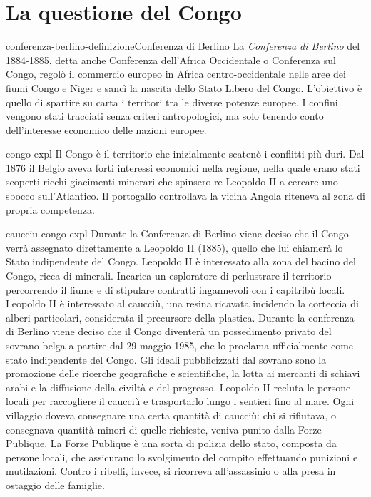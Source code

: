 \documentclass[preview]{standalone}
\begin{document}
\section{La questione del Congo}

\begin{snippetdefinition}{conferenza-berlino-definizione}{Conferenza di Berlino}
    La \textit{Conferenza di Berlino} del 1884-1885,
    detta anche Conferenza dell'Africa Occidentale o Conferenza sul Congo,
    regolò il commercio europeo in Africa
    centro-occidentale nelle aree dei fiumi Congo e Niger e sancì la
    nascita dello Stato Libero del Congo.
    L'obiettivo è quello di spartire su carta i territori tra le diverse potenze europee. 
    I confini vengono stati tracciati senza criteri antropologici,
    ma solo tenendo conto dell'interesse economico
    delle nazioni europee.
\end{snippetdefinition}

\begin{snippet}{congo-expl}
    Il Congo è il territorio che inizialmente scatenò i conflitti più duri.
    Dal 1876 il Belgio aveva forti interessi economici nella regione, nella quale
    erano stati scoperti ricchi giacimenti minerari che spinsero re Leopoldo II a cercare
    uno sbocco sull'Atlantico. Il portogallo controllava la vicina Angola riteneva al zona di propria competenza.
\end{snippet}

\begin{snippet}{caucciu-congo-expl}
    Durante la Conferenza di Berlino viene deciso che il Congo verrà assegnato
    direttamente a Leopoldo II (1885), quello che lui chiamerà lo Stato indipendente del Congo.
    Leopoldo II è interessato alla zona del bacino del Congo, ricca di
    minerali. Incarica un esploratore di perlustrare il territorio percorrendo il fiume e di stipulare
    contratti ingannevoli con i capitribù locali. Leopoldo II è interessato al caucciù, una resina
    ricavata incidendo la corteccia di alberi particolari, considerata il precursore della plastica.
    Durante la conferenza di Berlino viene deciso che il Congo diventerà un possedimento
    privato del sovrano belga a partire dal 29 maggio 1985, che lo proclama ufficialmente come
    stato indipendente del Congo. Gli ideali pubblicizzati dal sovrano sono la promozione delle
    ricerche geografiche e scientifiche, la lotta ai mercanti di schiavi arabi e la diffusione della
    civiltà e del progresso. Leopoldo II recluta le persone locali per raccogliere il caucciù e
    trasportarlo lungo i sentieri fino al mare. Ogni villaggio doveva consegnare una certa
    quantità di caucciù: chi si rifiutava, o consegnava quantità minori di quelle richieste, veniva
    punito dalla Forze Publique. La Forze Publique è una sorta di polizia dello stato, composta
    da persone locali, che assicurano lo svolgimento del compito effettuando punizioni e
    mutilazioni. Contro i ribelli, invece, si ricorreva all'assassinio o alla presa in ostaggio delle
    famiglie.
\end{snippet}
\end{document}
